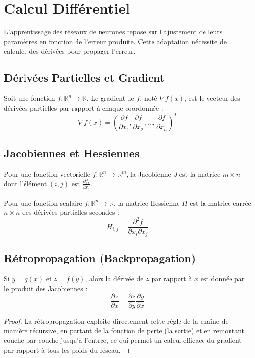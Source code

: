 \chapter{Calcul Différentiel}

L'apprentissage des réseaux de neurones repose sur l'ajustement de leurs paramètres en fonction de l'erreur produite. Cette adaptation nécessite de calculer des dérivées pour propager l'erreur.

\section{Dérivées Partielles et Gradient}

\begin{definition}[Gradient]
Soit une fonction $f : \mathbb{R}^n \rightarrow \mathbb{R}$. Le gradient de $f$, noté $\nabla f(x)$, est le vecteur des dérivées partielles par rapport à chaque coordonnée :
$$ \nabla f(x) = \left( \frac{\partial f}{\partial x_1}, \frac{\partial f}{\partial x_2}, \dots, \frac{\partial f}{\partial x_n} \right)^T $$
\end{definition}

\section{Jacobiennes et Hessiennes}

\begin{definition}
Pour une fonction vectorielle $f : \mathbb{R}^n \rightarrow \mathbb{R}^m$, la Jacobienne $J$ est la matrice $m \times n$ dont l'élément $(i,j)$ est $\frac{\partial f_i}{\partial x_j}$.
\end{definition}

\begin{definition}
Pour une fonction scalaire $f : \mathbb{R}^n \rightarrow \mathbb{R}$, la matrice Hessienne $H$ est la matrice carrée $n \times n$ des dérivées partielles secondes :
$$ H_{i,j} = \frac{\partial^2 f}{\partial x_i \partial x_j} $$
\end{definition}

\section{Rétropropagation (Backpropagation)}

\begin{theorem}
Si $y = g(x)$ et $z = f(y)$, alors la dérivée de $z$ par rapport à $x$ est donnée par le produit des Jacobiennes :
$$ \frac{\partial z}{\partial x} = \frac{\partial z}{\partial y} \frac{\partial y}{\partial x} $$
\end{theorem}

\begin{proof}
La rétropropagation exploite directement cette règle de la chaîne de manière récursive, en partant de la fonction de perte (la sortie) et en remontant couche par couche jusqu'à l'entrée, ce qui permet un calcul efficace du gradient par rapport à tous les poids du réseau.
\end{proof}
